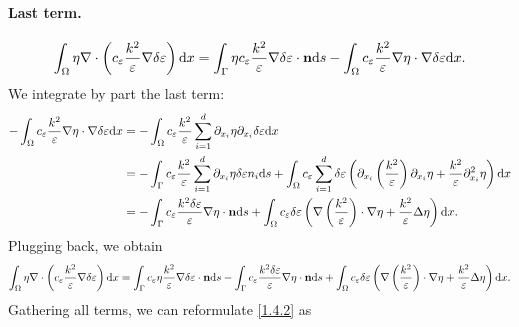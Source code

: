 \documentclass[oneside,11pt]{book}
\numberwithin{equation}{section}
\begin{document}
\paragraph*{Last term.}
\begin{align*}
    \int_\Omega \eta\nabla\cdot\left(c_\varepsilon\frac{k^2}{\varepsilon}\nabla\delta\varepsilon\right){\rm d}x = \int_\Gamma \eta c_\varepsilon\frac{k^2}{\varepsilon}\nabla\delta\varepsilon\cdot{\bf n}{\rm d}s - \int_\Omega c_\varepsilon\frac{k^2}{\varepsilon}\nabla\eta\cdot\nabla\delta\varepsilon{\rm d}x.
\end{align*}
We integrate by part the last term:
\begin{align*}
    -\int_\Omega c_\varepsilon\frac{k^2}{\varepsilon}\nabla\eta\cdot\nabla\delta\varepsilon{\rm d}x &= -\int_\Omega c_\varepsilon\frac{k^2}{\varepsilon}\sum_{i=1}^d \partial_{x_i}\eta\partial_{x_i}\delta\varepsilon{\rm d}x\\
    &= -\int_\Gamma c_\varepsilon\frac{k^2}{\varepsilon}\sum_{i=1}^d \partial_{x_i}\eta\delta\varepsilon n_i{\rm d}s + \int_\Omega c_\varepsilon\sum_{i=1}^d \delta\varepsilon\left(\partial_{x_i}\left(\frac{k^2}{\varepsilon}\right)\partial_{x_i}\eta + \frac{k^2}{\varepsilon}\partial_{x_i}^2\eta\right){\rm d}x\\
    &= -\int_\Gamma c_\varepsilon\frac{k^2\delta\varepsilon}{\varepsilon}\nabla\eta\cdot{\bf n}{\rm d}s + \int_\Omega c_\varepsilon\delta\varepsilon\left(\nabla\left(\frac{k^2}{\varepsilon}\right)\cdot\nabla\eta + \frac{k^2}{\varepsilon}\Delta\eta\right){\rm d}x.
\end{align*}
Plugging back, we obtain
\begin{align*}
    \int_\Omega \eta\nabla\cdot\left(c_\varepsilon\frac{k^2}{\varepsilon}\nabla\delta\varepsilon\right){\rm d}x = \int_\Gamma c_\varepsilon\eta\frac{k^2}{\varepsilon}\nabla\delta\varepsilon\cdot{\bf n}{\rm d}s - \int_\Gamma c_\varepsilon\frac{k^2\delta\varepsilon}{\varepsilon}\nabla\eta\cdot{\bf n}{\rm d}s + \int_\Omega c_\varepsilon\delta\varepsilon\left(\nabla\left(\frac{k^2}{\varepsilon}\right)\cdot\nabla\eta + \frac{k^2}{\varepsilon}\Delta\eta\right){\rm d}x.
\end{align*}
Gathering all terms, we can reformulate \eqref{1.4.2} as
\end{document}
